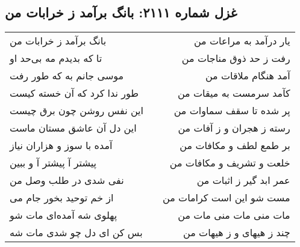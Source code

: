\begin{center}
\section*{غزل شماره ۲۱۱۱: بانگ برآمد ز خرابات من}
\label{sec:2111}
\begin{longtable}{l p{0.5cm} r}
بانگ برآمد ز خرابات من
&&
یار درآمد به مراعات من
\\
تا که بدیدم مه بی‌حد او
&&
رفت ز حد ذوق مناجات من
\\
موسی جانم به که طور رفت
&&
آمد هنگام ملاقات من
\\
طور ندا کرد که آن خسته کیست
&&
کآمد سرمست به میقات من
\\
این نفس روشن چون برق چیست
&&
پر شده تا سقف سماوات من
\\
این دل آن عاشق مستان ماست
&&
رسته ز هجران و ز آفات من
\\
آمده با سوز و هزاران نیاز
&&
بر طمع لطف و مکافات من
\\
پیشتر آ پیشتر آ و ببین
&&
خلعت و تشریف و مکافات من
\\
نفی شدی در طلب وصل من
&&
عمر ابد گیر ز اثبات من
\\
از خم توحید بخور جام می
&&
مست شو این است کرامات من
\\
پهلوی شه آمده‌ای مات شو
&&
مات منی مات منی مات من
\\
بس کن ای دل چو شدی مات شه
&&
چند ز هیهای و ز هیهات من
\\
\end{longtable}
\end{center}
